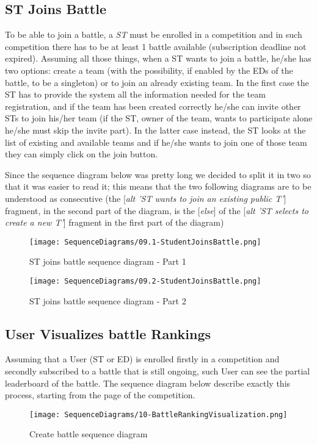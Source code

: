 \subsection*{ST Joins Battle}
To be able to join a battle, a \textit{ST} must be enrolled in a competition and in such competition there has to be at least 1 battle available (subscription deadline not expired). Assuming all those things, when a ST wants to join a battle, he/she has two options: create a team (with the possibility, if enabled by the EDs of the battle, to be a singleton) or to join an already existing team. In the first case the ST has to provide the system all the information needed for the team registration, and if the team has been created correctly he/she can invite other STs to join his/her team (if the ST, owner of the team, wants to participate alone he/she must skip the invite part). In the latter case instead, the ST looks at the list of existing and available teams and if he/she wants to join one of those team they can simply click on the join button.

Since the sequence diagram below was pretty long we decided to split it in two so that it was easier to read it; this means that the two following diagrams are to be understood as consecutive (the [\textit{alt 'ST wants to join an existing public T'}] fragment, in the second part of the diagram, is the [\textit{else}] of the [\textit{alt 'ST selects to create a new T'}] fragment in the first part of the diagram)


\begin{figure}[H]
  \centering
  \texttt{[image: SequenceDiagrams/09.1-StudentJoinsBattle.png]}
  \caption{ST joins battle sequence diagram - Part 1}
  \label{fig:st_joins_battle_1}
\end{figure}

\begin{figure}[H]
  \centering
  \texttt{[image: SequenceDiagrams/09.2-StudentJoinsBattle.png]}
  \caption{ST joins battle sequence diagram - Part 2}
  \label{fig:st_joins_battle_2}
\end{figure}

\subsection*{User Visualizes battle Rankings}
Assuming that a User (ST or ED) is enrolled firstly in a competition and secondly subscribed to a battle that is still ongoing, such User can see the partial leaderboard of the battle. The sequence diagram below describe exactly this process, starting from the page of the competition. 
\begin{figure}[H]
  \centering
  \texttt{[image: SequenceDiagrams/10-BattleRankingVisualization.png]}
  \caption{Create battle sequence diagram}
  \label{fig:user_visualize_rankings}
\end{figure}

